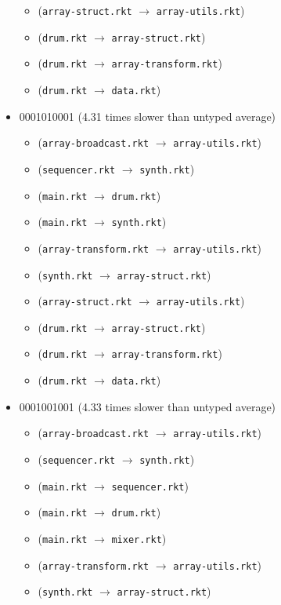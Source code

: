 \documentclass{article}
\newcommand{\mono}[1]{\texttt{#1}}
\begin{document}
\begin{itemize}
\begin{itemize}
  \item (\mono{array-struct.rkt} $\rightarrow$ \mono{array-utils.rkt})
  \item (\mono{drum.rkt} $\rightarrow$ \mono{array-struct.rkt})
  \item (\mono{drum.rkt} $\rightarrow$ \mono{array-transform.rkt})
  \item (\mono{drum.rkt} $\rightarrow$ \mono{data.rkt})
  \end{itemize}
\item 0001010001 (4.31 times slower than untyped average)
  \begin{itemize}
  \item (\mono{array-broadcast.rkt} $\rightarrow$ \mono{array-utils.rkt})
  \item (\mono{sequencer.rkt} $\rightarrow$ \mono{synth.rkt})
  \item (\mono{main.rkt} $\rightarrow$ \mono{drum.rkt})
  \item (\mono{main.rkt} $\rightarrow$ \mono{synth.rkt})
  \item (\mono{array-transform.rkt} $\rightarrow$ \mono{array-utils.rkt})
  \item (\mono{synth.rkt} $\rightarrow$ \mono{array-struct.rkt})
  \item (\mono{array-struct.rkt} $\rightarrow$ \mono{array-utils.rkt})
  \item (\mono{drum.rkt} $\rightarrow$ \mono{array-struct.rkt})
  \item (\mono{drum.rkt} $\rightarrow$ \mono{array-transform.rkt})
  \item (\mono{drum.rkt} $\rightarrow$ \mono{data.rkt})
  \end{itemize}
\item 0001001001 (4.33 times slower than untyped average)
  \begin{itemize}
  \item (\mono{array-broadcast.rkt} $\rightarrow$ \mono{array-utils.rkt})
  \item (\mono{sequencer.rkt} $\rightarrow$ \mono{synth.rkt})
  \item (\mono{main.rkt} $\rightarrow$ \mono{sequencer.rkt})
  \item (\mono{main.rkt} $\rightarrow$ \mono{drum.rkt})
  \item (\mono{main.rkt} $\rightarrow$ \mono{mixer.rkt})
  \item (\mono{array-transform.rkt} $\rightarrow$ \mono{array-utils.rkt})
  \item (\mono{synth.rkt} $\rightarrow$ \mono{array-struct.rkt})

\end{itemize}
\end{itemize}
\end{document}
